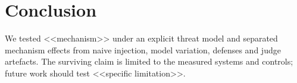 \section{Conclusion}
We tested <<mechanism>> under an explicit threat model and separated mechanism effects from naive injection,
model variation, defenses and judge artefacts. The surviving claim is limited to the measured systems and controls;
future work should test <<specific limitation>>.
